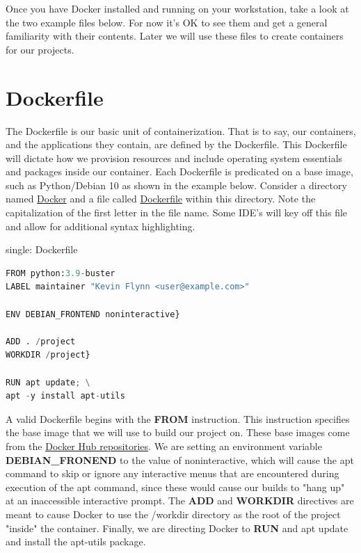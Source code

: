\justify
Once you have Docker installed and running on your workstation, take a
look at the two example files below. For now it's OK to see them and get
a general familiarity with their contents. Later we will use these files
to create containers for our projects.

\section{Dockerfile}
\justify
The Dockerfile is our basic unit of containerization. That is to say,
our containers, and the applications they contain, are defined by the
Dockerfile. This Dockerfile will dictate how we provision resources and
include operating system essentials and packages inside our container.
Each Dockerfile is predicated on a base image, such as Python/Debian 10
as shown in the example below.
\justify
Consider a directory named
\href{https://github.com/hotpeppersec/rapid_secdev_framework/tree/master/docker}{Docker}
and a file called
\href{https://github.com/hotpeppersec/rapid_secdev_framework/blob/master/docker/Dockerfile}{Dockerfile}
within this directory. Note the capitalization of the first letter in the file name. Some IDE's will key off this file and allow for additional syntax highlighting.

single: Dockerfile

\begin{lstlisting}[language=Python]
FROM python:3.9-buster
LABEL maintainer "Kevin Flynn <user@example.com>"

ENV DEBIAN_FRONTEND noninteractive}

ADD . /project
WORKDIR /project}

RUN apt update; \
apt -y install apt-utils
\end{lstlisting}
\justify
A valid Dockerfile begins with the \textbf{FROM} instruction. This
instruction specifies the base image that we will use to build our
project on. These base images come from the
\href{https://docs.docker.com/docker-hub/repos/}{Docker Hub
repositories}. We are setting an environment variable
\textbf{DEBIAN\_FRONEND} to the value of noninteractive, which will
cause the apt command to skip or ignore any interactive menus that are
encountered during execution of the apt command, since these would cause
our builds to "hang up" at an inaccessible interactive prompt. The
\textbf{ADD} and \textbf{WORKDIR} directives are meant to cause Docker
to use the /workdir directory as the root of the project "inside" the
container. Finally, we are directing Docker to \textbf{RUN} and apt
update and install the apt-utils package.

